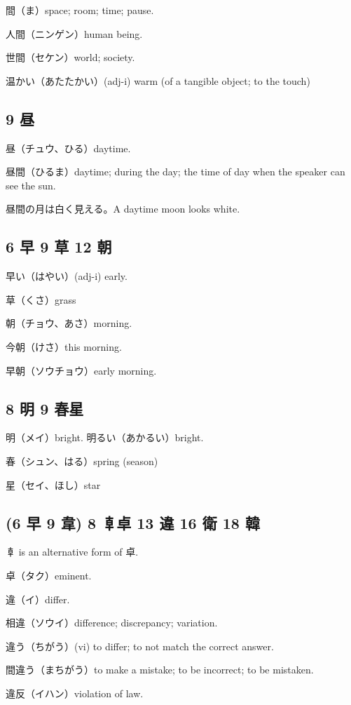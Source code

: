 間（ま）space; room; time; pause.

人間（ニンゲン）human being.

世間（セケン）world; society.

温かい（あたたかい）(adj-i) warm (of a tangible object; to the touch)

\subsection{9 昼}

昼（チュウ、ひる）daytime.

昼間（ひるま）daytime; during the day;
the time of day when the speaker can see the sun.

昼間の月は白く見える。A daytime moon looks white.

\subsection{6 早 9 草 12 朝}

早い（はやい）(adj-i) early.

草（くさ）grass

朝（チョウ、あさ）morning.

今朝（けさ）this morning.

早朝（ソウチョウ）early morning.

\subsection{8 明 9 春星}

明（メイ）bright.
明るい（あかるい）bright.

春（シュン、はる）spring (season)

星（セイ、ほし）star

\subsection{(6 早 9 韋) 8 𠦝卓 13 違 16 衛 18 韓}

𠦝 is an alternative form of 卓.

卓（タク）eminent.

違（イ）differ.

相違（ソウイ）difference; discrepancy; variation.

違う（ちがう）(vi) to differ; to not match the correct answer.

間違う（まちがう）to make a mistake; to be incorrect; to be mistaken.

違反（イハン）violation of law.

